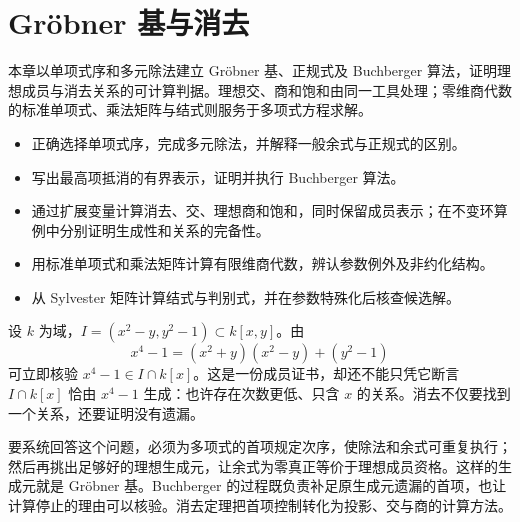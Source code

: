 
\chapter{Gröbner 基与消去}
\label{b3:ch:08}

\begin{chapterabstract}
	本章以单项式序和多元除法建立 Gröbner 基、正规式及 Buchberger 算法，证明理想成员与消去关系的可计算判据。理想交、商和饱和由同一工具处理；零维商代数的标准单项式、乘法矩阵与结式则服务于多项式方程求解。
\end{chapterabstract}

\begin{learninggoals}
	\begin{itemize}
		\item 正确选择单项式序，完成多元除法，并解释一般余式与正规式的区别。
		\item 写出最高项抵消的有界表示，证明并执行 Buchberger 算法。
		\item 通过扩展变量计算消去、交、理想商和饱和，同时保留成员表示；在不变环算例中分别证明生成性和关系的完备性。
		\item 用标准单项式和乘法矩阵计算有限维商代数，辨认参数例外及非约化结构。
		\item 从 Sylvester 矩阵计算结式与判别式，并在参数特殊化后核查候选解。
	\end{itemize}
\end{learninggoals}

设 \(k\) 为域，\(I=(x^2-y,y^2-1)\subset k[x,y]\)。由
\[
	x^4-1=(x^2+y)(x^2-y)+(y^2-1)
\]
可立即核验 \(x^4-1\in I\cap k[x]\)。这是一份成员证书，却还不能只凭它断言 \(I\cap k[x]\) 恰由 \(x^4-1\) 生成：也许存在次数更低、只含 \(x\) 的关系。消去不仅要找到一个关系，还要证明没有遗漏。

\ProseParagraphBreak

要系统回答这个问题，必须为多项式的首项规定次序，使除法和余式可重复执行；然后再挑出足够好的理想生成元，让余式为零真正等价于理想成员资格。这样的生成元就是 Gröbner 基。Buchberger 的过程既负责补足原生成元遗漏的首项，也让计算停止的理由可以核验。消去定理把首项控制转化为投影、交与商的计算方法。

